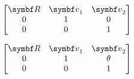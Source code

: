 

\begin{equation}
  \begin{bmatrix}
    \bR & \bv_1 & \bv_2 \\
    0 & 1 & 0 \\
    0 & 0 & 1
  \end{bmatrix}
\end{equation}

\cite[p. 321]{marsden_introduction_1998}

\begin{equation}
  \begin{bmatrix}
    \bR & \bv_1 & \bv_2 \\
    0 & 1 & \theta \\
    0 & 0 & 1
  \end{bmatrix}
\end{equation}
